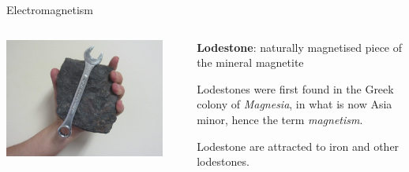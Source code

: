 \begin{frame}{Electromagnetism}
\vspace{0.1cm}

\begin{columns}
  \begin{column}{0.35\textwidth}
   \begin{center}
      \includegraphics[width=0.90\textwidth]{./images/photos/lodestone_1.jpg}\\
   \end{center}
  \end{column}
  \begin{column}{0.65\textwidth}
   \begin{itemize}
    {\small
     \item {\bf Lodestone}: naturally magnetised piece of the mineral magnetite
     \begin{itemize}
     {\scriptsize
       \item Lodestones were first found in the Greek colony of {\em Magnesia},
             in what is now Asia minor, hence the term {\em magnetism}.
     }
     \end{itemize}
     \item Lodestone are attracted to iron and other lodestones.
    }
    \end{itemize}
  \end{column}
\end{columns}

\end{frame}


%
%
%

